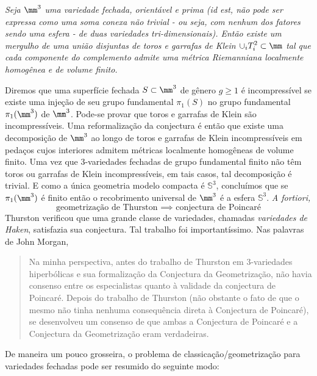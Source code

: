 \begin{conjec} \textit{
Seja $\mm^3$ uma variedade fechada, orientável e prima (id est, não pode ser expressa como uma soma conexa não trivial - ou seja, com nenhum dos fatores sendo uma esfera - de duas variedades tri-dimensionais). Então existe um mergulho de uma união disjuntas de toros e garrafas de Klein  $\displaystyle{\cup_{i} T_i^2 \subset \mm}$ tal que cada componente do complemento admite uma métrica Riemanniana localmente homogênea e de volume finito.}
\end{conjec}
Diremos que uma superfície fechada $S \subset \mm^3$ de gênero $g \geq 1$ é incompressível se existe uma injeção de seu grupo fundamental $\pi_1(S)$ no grupo fundamental $\pi_1(\mm^3)$ de $\mm^3$. Pode-se provar que toros e garrafas de Klein são incompressíveis. Uma reformalização da conjectura é então que existe uma decomposição de $\mm^3$ ao longo de toros e garrafas de Klein incompressíveis em pedaços cujos interiores admitem métricas localmente homogêneas de volume finito. Uma vez que $3$-variedades fechadas de grupo fundamental finito não têm toros ou garrafas de Klein incompressíveis, em tais casos, tal decomposição é trivial. E como a única geometria modelo compacta é $\mathbb{S}^3$, concluímos que se $\pi_1(\mm^3)$ é finito então o recobrimento universal de $\mm^3$ é a esfera $\mathbb{S}^3$. \emph{A fortiori,}
\[
\text{geometrização de Thurston $\implies$ conjectura de Poincaré}
\]
Thurston verificou que uma grande classe de variedades, chamadas \emph{variedades de Haken}, satisfazia sua conjectura. Tal trabalho foi importantíssimo. Nas palavras de John Morgan, 
\blockquote{
Na minha perspectiva, antes do trabalho de Thurston em $3$-variedades hiperbólicas e sua formalização da Conjectura da Geometrização, não havia consenso entre os especialistas quanto à validade da conjectura de Poincaré. Depois do trabalho de Thurston (não obstante o fato de que o mesmo não tinha nenhuma consequência direta à Conjectura de Poincaré), se desenvolveu um consenso de que ambas a Conjectura de Poincaré e a Conjectura da Geometrização eram verdadeiras.
}
De maneira um pouco grosseira, o problema de classicação/geometrização para variedades fechadas pode ser resumido do seguinte modo: 
